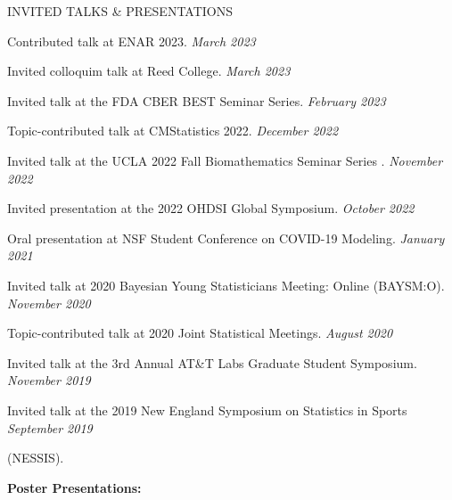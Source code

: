 \documentclass{resume} %
\begin{document}
\begin{rSection}{INVITED TALKS \& PRESENTATIONS}
	
	Contributed talk at ENAR 2023. \hfill {\em March 2023}
	
	Invited colloquim talk at Reed College. \hfill {\em March 2023}
	
	Invited talk at the FDA CBER BEST Seminar Series. \hfill {\em February 2023}
	
	Topic-contributed talk at CMStatistics 2022. \hfill {\em December 2022}
	
	Invited talk at the UCLA 2022 Fall Biomathematics Seminar Series . \hfill {\em November 2022}
	
	Invited presentation at the 2022 OHDSI Global Symposium.  \hfill {\em October 2022}
	
	{Oral presentation at NSF Student Conference on COVID-19 Modeling.} \hfill {\em January 2021}
	
	{Invited talk at 2020 Bayesian Young Statisticians Meeting: Online (BAYSM:O).} \hfill {\em November 2020}
	
	{Topic-contributed talk at 2020 Joint Statistical Meetings. } \hfill {\em August 2020}
	
	{Invited talk at the 3rd Annual AT\&T Labs Graduate Student Symposium.} \hfill {\em November 2019}
	
	
	{Invited talk at the 2019 New England Symposium on Statistics in Sports} \hfill {\em September 2019}
	
	\vspace{-0.1in}
	(NESSIS).
	
	
	
	
	
	\medskip
	
	\hspace*{-0.2in}\textbf{Poster Presentations:}
	

\end{rSection}
\end{document}
